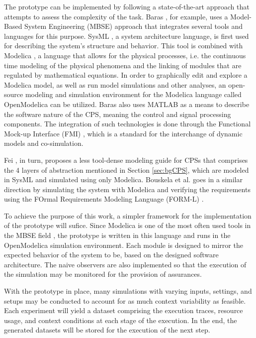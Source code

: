 The prototype can be implemented by following a state-of-the-art approach that attempts to assess the complexity of the task. Baras \cite{baras2019formal}, for example, uses a Model-Based System Engineering (MBSE) approach that integrates several tools and languages for this purpose. SysML \cite{balestrini2015object}, a system architecture language, is first used for describing the system's structure and behavior. This tool is combined with Modelica \cite{Modelica}, a language that allows for the physical processes, i.e. the continuous time modeling of the physical phenomena and the linking of modules that are regulated by mathematical equations. In order to graphically edit and explore a Modelica model, as well as run model simulations and other analyses, an open-source modeling and simulation environment for the Modelica language called OpenModelica \cite{OpenModelica} can be utilized. Baras also uses MATLAB \cite{higham2016matlab} as a means to describe the software nature of the CPS, meaning the control and signal processing components. The integration of such technologies is done through the Functional Mock-up Interface (FMI) \cite{blochwitz2011functional}, which is a standard for the interchange of dynamic models and co-simulation.

Fei \cite{deng2019modeling}, in turn, proposes a less tool-dense modeling guide for CPSs that comprises the 4 layers of abstraction mentioned in Section \ref{sec:bgCPS}, which are modeled in SysML and simulated using only Modelica. Bouskela et al. \cite{bouskela2022formal} goes in a similar direction by simulating the system with Modelica and verifying the requirements using the FOrmal Requirements Modeling Language (FORM-L) \cite{nguyen2014form}.


To achieve the purpose of this work, a simpler framework for the implementation of the prototype will sufice. Since Modelica is one of the most often used tools in the MBSE field \cite{mohamed2021model}, the prototype is written in this language and runs in the OpenModelica simulation environment. Each module is designed to mirror the expected behavior of the system to be, based on the designed software architecture. The naive observers are also implemented so that the execution of the simulation may be monitored for the provision of assurances.

With the prototype in place, many simulations with varying inputs, settings, and setups may be conducted to account for as much context variability as feasible. Each experiment will yield a dataset comprising the execution traces, resource usage, and context conditions at each stage of the execution. In the end, the generated datasets will be stored for the execution of the next step.


